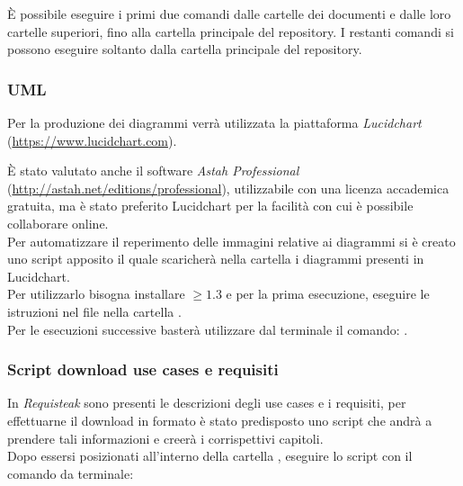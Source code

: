 È possibile eseguire i primi due comandi dalle cartelle dei documenti e dalle loro cartelle superiori, fino alla cartella principale del repository. I restanti comandi si possono eseguire soltanto dalla cartella principale del repository.

\subsubsection{UML}
		
	Per la produzione dei diagrammi \emph{} verrà utilizzata la piattaforma \emph{Lucidchart}
	(\url{https://www.lucidchart.com}).
		
	È stato valutato anche il software \emph{Astah Professional} (\url{http://astah.net/editions/professional}), utilizzabile con
	una licenza accademica gratuita, ma è stato preferito Lucidchart per la facilità con cui è possibile collaborare online.\\
		
	Per automatizzare il reperimento delle immagini relative ai diagrammi  si è creato uno script apposito il quale
	scaricherà nella cartella  i diagrammi presenti in Lucidchart. \\
	Per utilizzarlo bisogna installare  $\geq 1.3$ e per la prima esecuzione, eseguire le istruzioni nel file
	 nella cartella . \\ 
	Per le esecuzioni successive basterà utilizzare dal terminale il comando: .
	
\subsubsection{Script download use cases e requisiti}
	In \emph{Requisteak} sono presenti le descrizioni degli use cases e i requisiti, per effettuarne il download in formato
	 è stato predisposto uno script che andrà a prendere tali informazioni e creerà i corrispettivi capitoli.\\
	 Dopo essersi posizionati all'interno della cartella , eseguire lo script con il comando da terminale:
	  \\
	

